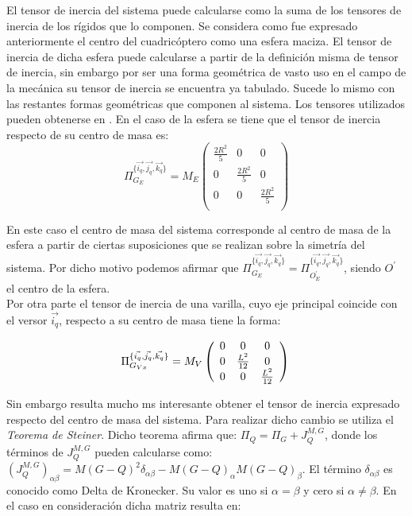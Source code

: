 \documentclass[main]{subfiles}
\begin{document}
\label{tensores}

El tensor de inercia del sistema puede calcularse como la suma de los tensores de inercia de los rígidos que lo componen. Se considera como fue expresado anteriormente el centro del cuadricóptero como una esfera maciza. El tensor de inercia de dicha esfera puede calcularse a partir de la definición misma de tensor de inercia, sin embargo por ser una forma geométrica de vasto uso en el campo de la mecánica su tensor de inercia se encuentra ya tabulado. Sucede lo mismo con las restantes formas geométricas que componen al sistema. Los tensores utilizados pueden obtenerse en \cite{bib:inercia}. En el caso de la esfera se tiene que el tensor de inercia respecto de  su centro de masa es:
\begin{equation}
\Pi_{G_E}^{\{\vec{i_q}, \vec{j_q}, \vec{k_q}\}}= M_E\left(\begin{array}{ccc}
\frac{2R^2}{5}  &0&  0\\
0  &\frac{2R^2}{5} & 0\\
0  &0 & \frac{2R^2}{5} \\
\end{array}\right) 
\end{equation}

En este caso el centro de masa del sistema corresponde al centro de masa de la esfera a partir de ciertas suposiciones que se realizan sobre la simetría del sistema. Por dicho motivo podemos afirmar que $\Pi_{G_E}^{\{\vec{i_q}, \vec{j_q}, \vec{k_q}\}} = \Pi_{O^{\prime} _E}^{\{\vec{i_q}, \vec{j_q}, \vec{k_q}\}} $, siendo $O^{\prime}$ el centro de la esfera.\\

Por otra parte el tensor de inercia de una varilla, cuyo eje principal coincide con el versor $\vec{i_q}$, respecto a su centro de masa tiene la forma:

\begin{equation}
\Pi_{G_{Vx}}^{\{\vec{i_q}, \vec{j_q}, \vec{k_q}\}}= M_V\left(\begin{array}{ccc}
0  &0&  0\\
0  &\frac{L^2}{12} & 0\\
0  &0 & \frac{L^2}{12}  \\
\end{array}\right) \\ 
\end{equation}

Sin embargo resulta mucho ms interesante obtener el tensor de inercia expresado respecto del centro de masa del sistema. Para realizar dicho cambio se utiliza el \emph{Teorema de Steiner}. Dicho teorema afirma que: $\Pi_Q = \Pi_G +J_Q^{M,G}$, donde los términos de $J_Q^{M,G}$ pueden calcularse como: $(J_Q^{M,G})_{\alpha \beta} = M(G-Q)^2\delta_{\alpha \beta}-M(G-Q)_{\alpha}M(G-Q)_{\beta}$. El término $\delta_{\alpha \beta}$ es conocido como Delta de Kronecker. Su valor es uno si $\alpha =\beta$ y cero si $\alpha \neq \beta$. En el caso en consideración dicha matriz resulta en:
\end{document}
